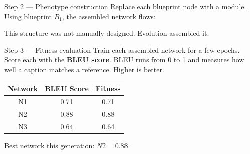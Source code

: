 \documentclass[a4paper,11pt]{article}
\newcommand{\vocab}[1]{\textbf{\color{navy}#1}}
\begin{document}
\begin{worked}{Step 2 --- Phenotype construction}
Replace each blueprint node with a module.
Using blueprint $B_1$, the assembled network flows:

\medskip
\begin{center}
\end{center}

\medskip
This structure was not manually designed.
Evolution assembled it.
\end{worked}

\begin{worked}{Step 3 --- Fitness evaluation}
Train each assembled network for a few epochs.
Score each with the \vocab{BLEU score}.
BLEU runs from 0 to 1 and measures how well a caption matches a reference.
Higher is better.

\begin{center}\small
\begin{tabular}{@{}ccc@{}}
\toprule
\textbf{Network} & \textbf{BLEU Score} & \textbf{Fitness} \\
\midrule
N1 & 0.71 & 0.71 \\
N2 & 0.88 & 0.88 \\
N3 & 0.64 & 0.64 \\
\bottomrule
\end{tabular}
\end{center}

Best network this generation: $N2 = 0.88$.
\end{worked}
\end{document}
